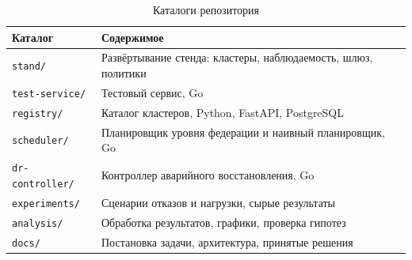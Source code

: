 \begin{table}[ht]
  \centering
  \caption{Каталоги репозитория}
  \small
  \begin{tabularx}{\textwidth}{@{}lX@{}}
    \toprule
    Каталог & Содержимое \\
    \midrule
    \texttt{stand/} & Развёртывание стенда: кластеры, наблюдаемость, шлюз,
      политики \\
    \texttt{test-service/} & Тестовый сервис, Go \\
    \texttt{registry/} & Каталог кластеров, Python, FastAPI, PostgreSQL \\
    \texttt{scheduler/} & Планировщик уровня федерации и наивный
      планировщик, Go \\
    \texttt{dr-controller/} & Контроллер аварийного восстановления, Go \\
    \texttt{experiments/} & Сценарии отказов и нагрузки, сырые результаты \\
    \texttt{analysis/} & Обработка результатов, графики, проверка гипотез \\
    \texttt{docs/} & Постановка задачи, архитектура, принятые решения \\
    \bottomrule
  \end{tabularx}
\end{table}
